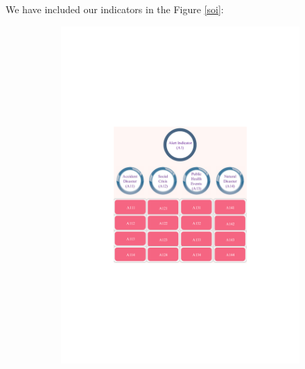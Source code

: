 \documentclass[12pt]{article}  %
\begin{document}
We have included our indicators in the Figure \ref{soi}:
\begin{figure}[htbp]
\centering
\begin{subfigure}[b]{.32\textwidth}
\includegraphics[width=\textwidth]{img/1.pdf}
\end{subfigure}
\begin{subfigure}[b]{.32\textwidth}

\end{subfigure}
\end{figure}
\end{document}
